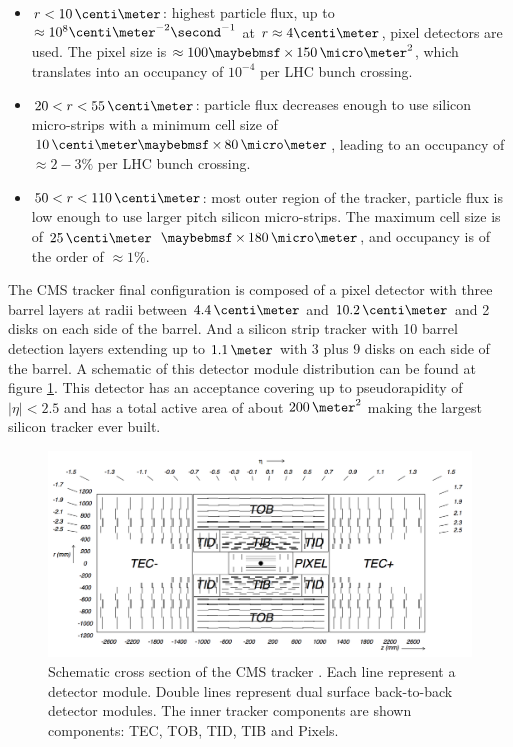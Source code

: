 \begin{itemize}
  \item $r<10\,\centi\meter$: highest particle flux, up to $\approx 10^8 \centi\meter^{-2}\second^{-1}$ at $r \approx 4 \centi\meter$, pixel detectors are used. The pixel size is $\approx 100 \times 150\,\micro\meter^2$, which translates into an occupancy of $10^{-4}$ per \gls{LHC} bunch crossing.
  \item $20<r<55\,\centi\meter$: particle flux decreases enough to use silicon micro-strips with a minimum cell size of $10\,\centi\meter \times 80\,\micro\meter$, leading to an occupancy of $\approx 2-3\%$ per \gls{LHC} bunch crossing.
  \item $50<r<110\,\centi\meter$: most outer region of the tracker, particle flux is low enough to use larger pitch silicon micro-strips. The maximum cell size is of $25\,\centi\meter$ $\times 180\,\micro\meter$, and occupancy is of the order of $\approx 1\%$.
\end{itemize}

The \gls{CMS} tracker final configuration is composed of a pixel detector with three barrel layers at radii between $4.4\,\centi\meter$ and $10.2\,\centi\meter$ and 2 disks on each side of the barrel. And a silicon strip tracker with 10 barrel detection layers extending up to $1.1\,\meter$ with 3 plus 9 disks on each side of the barrel. A schematic of this detector module distribution can be found at figure \ref{FIGURE:ExperimentalApparatus_CMS_Tracker_Layout}. This detector has an acceptance covering up to pseudorapidity of $|\eta|<2.5$ and has a total active area of about $200\,\meter^2$ making the largest silicon tracker ever built. 

\begin{figure}[!htb]
  \centering
  \includegraphics[width=1.0\textwidth]{Chapter02/CMS/Images/CMS_Tracker_Layout.png}
  \caption{Schematic cross section of the CMS tracker \cite{ARTICLE:TheCMSExperiment}. Each line represent a detector module. Double lines represent dual surface back-to-back detector modules. The inner tracker components are shown components: \gls{TEC}, \gls{TOB}, \gls{TID}, \gls{TIB} and Pixels. }
  \label{FIGURE:ExperimentalApparatus_CMS_Tracker_Layout}
\end{figure}

